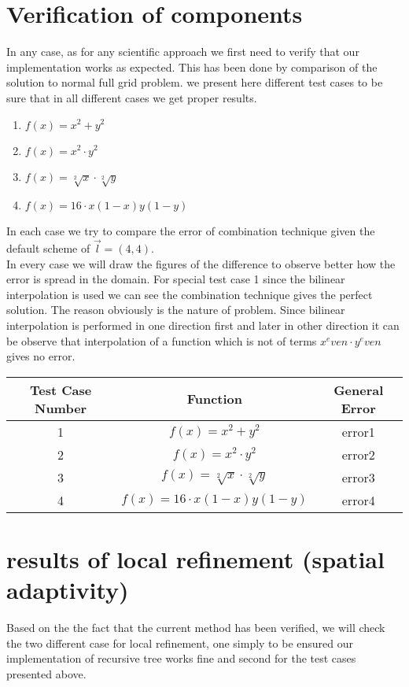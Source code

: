 \section{Verification of components}
In any case, as for any scientific approach we first need to verify that our implementation works as expected. This has been done by comparison of the solution to normal full grid problem. we present here different test cases to be sure that in all different cases we get proper results.
\begin{enumerate}
\item $f(x)=x^2+y^2$
\item $f(x)=x^2 \cdot y^2 $
\item $f(x)=\sqrt[2]{x} \cdot \sqrt[2]{y}$
\item $f(x)=16 \cdot x(1-x)y(1-y)$
\end{enumerate}
In each case we try to compare the error of combination technique given the default scheme of $\overrightarrow{l}=(4,4)$.\\
In every case we will draw the figures of the difference to observe better how the error is spread in the domain. For special test case 1 since the bilinear interpolation is used we can see the combination technique gives the perfect solution. The reason obviously is the nature of problem. Since bilinear interpolation is performed in one direction first and later in other direction it can be observe that interpolation of a function which is not of terms $x^even \cdot y^even$ gives no error.
\begin{center}
 \begin{tabular}{| c | c | c |}
\hline
 Test Case Number & Function &  General Error\\
 \hline
 1 & $f(x)=x^2+y^2$ & error1\\
 \hline
 2 & $f(x)=x^2 \cdot y^2 $ & error2\\
 \hline
 3 & $f(x)=\sqrt[2]{x} \cdot \sqrt[2]{y}$ & error3\\
 \hline
 4 & $f(x)=16 \cdot x(1-x)y(1-y)$ & error4\\
 \hline
 \end{tabular}
\end{center}



\section{results of local refinement (spatial adaptivity)}
Based on the the fact that the current method has been verified, we will check the two different case for local refinement, one simply to be ensured our implementation of recursive tree works fine and second for the test cases presented above. 
